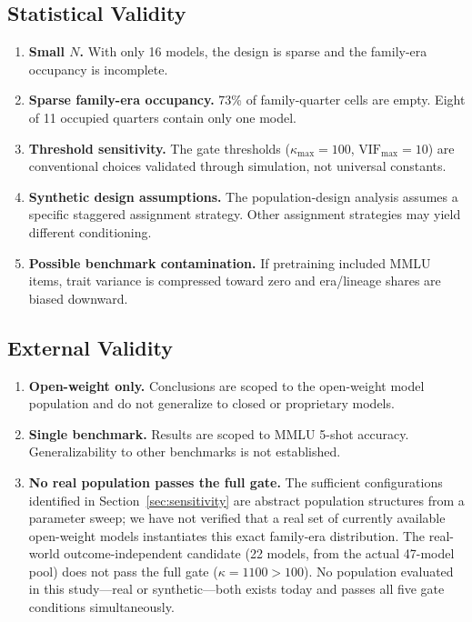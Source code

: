 \documentclass[11pt]{article}
\theoremstyle{definition}
\theoremstyle{plain}
\begin{document}
\subsection{Statistical Validity}
\begin{enumerate}
\item \textbf{Small $N$.} With only 16 models, the design is sparse and the family-era occupancy is incomplete.
\item \textbf{Sparse family-era occupancy.} 73\% of family-quarter cells are empty. Eight of 11 occupied quarters contain only one model.
\item \textbf{Threshold sensitivity.} The gate thresholds ($\kappa_{\max} = 100$, $\text{VIF}_{\max} = 10$) are conventional choices validated through simulation, not universal constants.
\item \textbf{Synthetic design assumptions.} The population-design analysis assumes a specific staggered assignment strategy. Other assignment strategies may yield different conditioning.
\item \textbf{Possible benchmark contamination.} If pretraining included MMLU items, trait variance is compressed toward zero and era/lineage shares are biased downward.
\end{enumerate}

\subsection{External Validity}
\begin{enumerate}
\item \textbf{Open-weight only.} Conclusions are scoped to the open-weight model population and do not generalize to closed or proprietary models.
\item \textbf{Single benchmark.} Results are scoped to MMLU 5-shot accuracy. Generalizability to other benchmarks is not established.
\item \textbf{No real population passes the full gate.} The sufficient configurations identified in Section~\ref{sec:sensitivity} are abstract population structures from a parameter sweep; we have not verified that a real set of currently available open-weight models instantiates this exact family-era distribution. The real-world outcome-independent candidate (22 models, from the actual 47-model pool) does not pass the full gate ($\kappa = 1100 > 100$). No population evaluated in this study---real or synthetic---both exists today and passes all five gate conditions simultaneously.
\end{enumerate}
\end{document}
